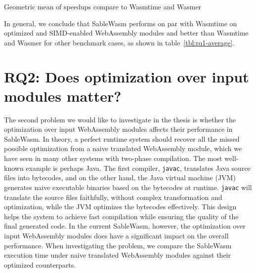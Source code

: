 \begin{table}
    \centering
    
    \caption{Geometric mean of speedups compare to Wasmtime and Wasmer}
    \label{tbl:rq1-average}
\end{table}

In general, we conclude that SableWasm performs on par with Wasmtime on
optimized and SIMD-enabled WebAssembly modules and better than Wasmtime and
Wasmer for other benchmark cases, as shown in table~\ref{tbl:rq1-average}.

\section[RQ2: Does optimization over input modules matter?]{
  {\large RQ2: Does optimization over input modules matter?}}

The second problem we would like to investigate in the thesis is whether the
optimization over input WebAssembly modules affects their performance in
SableWasm. In theory, a perfect runtime system should recover all the missed
possible optimization from a naive translated WebAssembly module, which we
have seen in many other systems with two-phase compilation. The most well-known
example is perhaps Java. The first compiler, \texttt{javac}, translates Java
source files into bytecodes, and on the other hand, the Java virtual machine
(JVM) generates naive executable binaries based on the bytecodes at runtime.
\texttt{javac} will translate the source files faithfully, without complex
transformation and optimization, while the JVM optimizes the bytecodes
effectively. This design helps the system to achieve fast compilation while
ensuring the quality of the final generated code. In the current SableWasm,
however, the optimization over input WebAssembly modules does have a significant
impact on the overall performance. When investigating the problem, we compare
the SableWasm execution time under naive translated WebAssembly modules against
their optimized counterparts.


